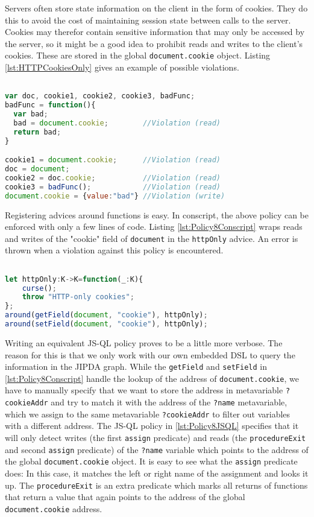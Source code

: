 Servers often store state information on the client in the form of cookies. They do this to avoid the cost of maintaining session state between calls to the server. Cookies may therefor contain sensitive information that may only be accessed by the server, so it might be a good idea to prohibit reads and writes to the client's cookies. These are stored in the global \texttt{document.cookie} object. Listing \ref{lst:HTTPCookiesOnly} gives an example of possible violations.

\begin{lstlisting}[label={lst:HTTPCookiesOnly},language=JavaScript,caption=HTTP-cookies only example,mathescape=true]  % float=t?

var doc, cookie1, cookie2, cookie3, badFunc;
badFunc = function(){
  var bad;
  bad = document.cookie;        //Violation (read)
  return bad;
}

cookie1 = document.cookie;      //Violation (read)
doc = document;
cookie2 = doc.cookie;           //Violation (read)
cookie3 = badFunc();            //Violation (read)
document.cookie = {value:"bad"} //Violation (write)
\end{lstlisting}

Registering advices around functions is easy. In conscript, the above policy can be enforced with only a few lines of code. Listing \ref{lst:Policy8Conscript} wraps reads and writes of the "cookie" field of \texttt{document} in the \texttt{httpOnly} advice. An error is thrown when a violation against this policy is encountered.

\begin{lstlisting}[label={lst:Policy8Conscript},language=JavaScript,caption=Policy 8 in ConScript,mathescape=true]  % float=t?

let httpOnly:K->K=function(_:K){ 
    curse(); 
    throw "HTTP-only cookies"; 
};
around(getField(document, "cookie"), httpOnly); 
around(setField(document, "cookie"), httpOnly);
\end{lstlisting}

Writing an equivalent JS-QL policy proves to be a little more verbose. The reason for this is that we only work with our own embedded DSL to query the information in the JIPDA graph. While the \texttt{getField} and \texttt{setField} in \ref{lst:Policy8Conscript} handle the lookup of the address of \texttt{document.cookie}, we have to manually specify that we want to store the address in metavariable \texttt{?cookieAddr} and try to match it with the address of the \texttt{?name} metavariable, which we assign to the same metavariable \texttt{?cookieAddr} to filter out variables with a different address. The JS-QL policy in \ref{lst:Policy8JSQL} specifies that it will only detect writes (the first \texttt{assign} predicate) and reads (the \texttt{procedureExit} and second \texttt{assign} predicate) of the \texttt{?name} variable which points to the address of the global \texttt{document.cookie} object. It is easy to see what the \texttt{assign} predicate does: In this case, it matches the left or right name of the assignment and looks it up. The \texttt{procedureExit} is an extra predicate which marks all returns of functions that return a value that again points to the address of the global \texttt{document.cookie} address.


